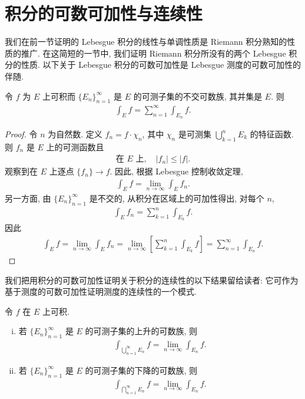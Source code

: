 \documentclass[../../main.tex]{subfiles}
\begin{document}
\section{积分的可数可加性与连续性}\label{section:ch04-可数可加连续}

我们在前一节证明的 Lebesgue 积分的线性与单调性质是 Riemann 积分熟知的性质的推广. 在这简短的一节中, 我们证明 Riemann 积分所没有的两个 Lebesgue 积分的性质. 以下关于 Lebesgue 积分的可数可加性是 Lebesgue 测度的可数可加性的伴随.

\begin{theorem}[积分的可数可加性]\label{theorem:ch04-可数可加}
令 $f$ 为 $E$ 上可积而 $\{E_{n}\}_{n=1}^{\infty}$ 是 $E$ 的可测子集的不交可数族, 其并集是 $E$. 则
\begin{align}
\int_{E}f=\sum_{n=1}^{\infty}\int_{E_{n}}f.\label{align:ch04-可数可加}
\end{align}
\end{theorem}

\begin{proof}
令 $n$ 为自然数. 定义 $f_{n}=f\cdot\chi_{n}$, 其中 $\chi_{n}$ 是可测集 $\bigcup_{k=1}^{n}E_{k}$ 的特征函数. 则 $f_{n}$ 是 $E$ 上的可测函数且
\begin{align*}
\text{在 }E\text{ 上},\quad|f_{n}|\leqslant|f|.
\end{align*}
观察到在 $E$ 上逐点 $\{f_{n}\}\to f$. 因此, 根据 Lebesgue 控制收敛定理,
\begin{align*}
\int_{E}f=\lim_{n\to\infty}\int_{E}f_{n}.
\end{align*}
另一方面, 由 $\{E_{n}\}_{n=1}^{\infty}$ 是不交的, 从积分在区域上的可加性得出, 对每个 $n$,
\begin{align*}
\int_{E}f_{n}=\sum_{k=1}^{n}\int_{E_{k}}f.
\end{align*}
因此
\begin{align*}
\int_{E}f=\lim_{n\to\infty}\int_{E}f_{n}=\lim_{n\to\infty}\left[\sum_{k=1}^{n}\int_{E_{k}}f\right]=\sum_{n=1}^{\infty}\int_{E_{n}}f.
\end{align*}
\end{proof}

我们把用积分的可数可加性证明关于积分的连续性的以下结果留给读者: 它可作为基于测度的可数可加性证明测度的连续性的一个模式.

\begin{theorem}[积分的连续性]\label{theorem:ch04-积分连续}
令 $f$ 在 $E$ 上可积.
\begin{enumerate}[(i)]
\item 若 $\{E_{n}\}_{n=1}^{\infty}$ 是 $E$ 的可测子集的上升的可数族, 则
\begin{align}
\int_{\bigcup_{n=1}^{\infty}E_{n}}f=\lim_{n\to\infty}\int_{E_{n}}f.\label{align:ch04-上升连续}
\end{align}
\item 若 $\{E_{n}\}_{n=1}^{\infty}$ 是 $E$ 的可测子集的下降的可数族, 则
\begin{align}
\int_{\bigcap_{n=1}^{\infty}E_{n}}f=\lim_{n\to\infty}\int_{E_{n}}f.\label{align:ch04-下降连续}
\end{align}
\end{enumerate}
\end{theorem}
\end{document}
